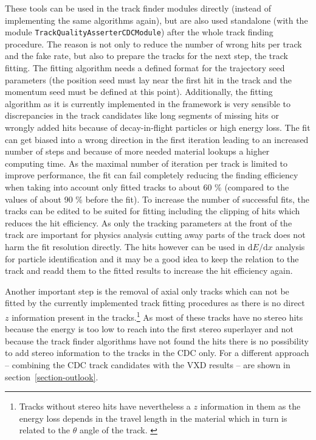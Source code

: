 These tools can be used in the track finder modules directly (instead of implementing the same algorithms again), but are also used standalone (with the module \texttt{Track\-Quality\-Asserter\-CDC\-Module}) after the whole track finding procedure. The reason is not only to reduce the number of wrong hits per track and the fake rate, but also to prepare the tracks for the next step, the track fitting. The fitting algorithm needs a defined format for the trajectory seed parameters (the position seed must lay near the first hit in the track and the momentum seed must be defined at this point). Additionally, the fitting algorithm as it is currently implemented in the framework is very sensible to discrepancies in the track candidates like long segments of missing hits or wrongly added hits because of decay-in-flight particles or high energy loss. The fit can get biased into a wrong direction in the first iteration leading to an increased number of steps and because of more needed material lookups a higher computing time. As the maximal number of iteration per track is limited to improve performance, the fit can fail completely reducing the finding efficiency when taking into account only fitted tracks to about 60 \% (compared to the values of about 90 \% before the fit). To increase the number of successful fits, the tracks can be edited to be suited for fitting including the clipping of hits which reduces the hit efficiency. As only the tracking parameters at the front of the track are important for physics analysis cutting away parts of the track does not harm the fit resolution directly. The hits however can be used in $\mathrm d E/\mathrm d x$ analysis for particle identification and it may be a good idea to keep the relation to the track and readd them to the fitted results to increase the hit efficiency again. 

Another important step is the removal of axial only tracks which can not be fitted by the currently implemented track fitting procedures as there is no direct $z$ information present in the tracks.\footnote{Tracks without stereo hits have nevertheless a $z$ information in them as the energy loss depends in the travel length in the material which in turn is related to the $\theta$ angle of the track. \cite{martin}} As most of these tracks have no stereo hits because the energy is too low to reach into the first stereo superlayer and not because the track finder algorithms have not found the hits there is no possibility to add stereo information to the tracks in the CDC only. For a different approach -- combining the CDC track candidates with the VXD results -- are shown in section~\ref{section-outlook}.

